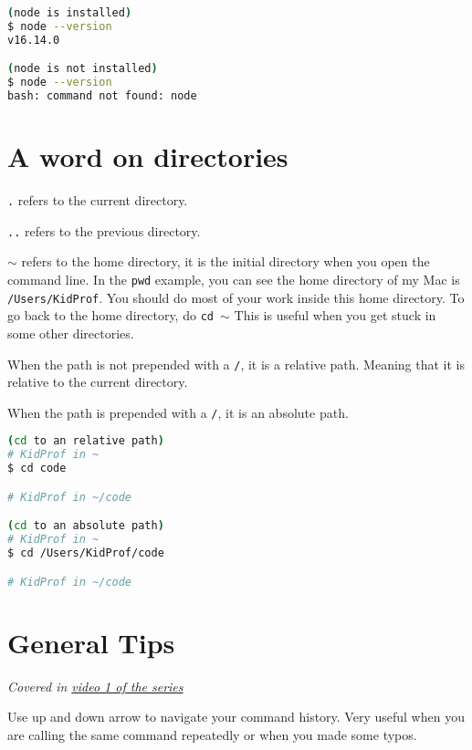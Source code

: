 \begin{lstlisting}[language=bash]
(node is installed)
$ node --version
v16.14.0

(node is not installed)
$ node --version
bash: command not found: node
\end{lstlisting}

\section{A word on directories}
\label{sec:dir}
\texttt{.} refers to the current directory.

\texttt{..} refers to the previous directory.
\vspace{6mm}

\texttt{$\sim$} refers to the home directory, it is the initial directory when you open the command line. In the \texttt{pwd} example, you can see the home directory of my Mac is \texttt{/Users/KidProf}. You should do most of your work inside this home directory. To go back to the home directory, do \texttt{cd $\sim$} This is useful when you get stuck in some other directories.
\vspace{6mm}

When the path is not prepended with a \texttt{/}, it is a relative path. Meaning that it is relative to the current directory.

When the path is prepended with a \texttt{/}, it is an absolute path. 

\begin{lstlisting}[language=bash]
(cd to an relative path)
# KidProf in ~
$ cd code

# KidProf in ~/code

(cd to an absolute path)
# KidProf in ~
$ cd /Users/KidProf/code

# KidProf in ~/code
\end{lstlisting}

\section{General Tips}

\textit{Covered in \href{https://www.youtube.com/watch?v=oIsH0V3fRt8&list=PLjGmdnqrOKuYXiu7lgG5HW71jPEUd1XCm&index=2}{video 1 of the series}}
\vspace{6mm}

Use up and down arrow to navigate your command history. Very useful when you are calling the same command repeatedly or when you made some typos.
\vspace{6mm}

